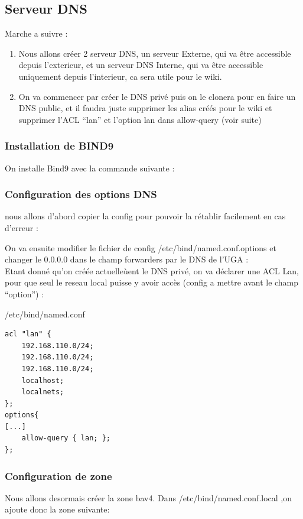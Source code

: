 \documentclass{article}
\begin{document}
\subsection{Serveur DNS}
Marche a suivre :
\begin{enumerate}
	\item Nous allons créer 2 serveur DNS, un serveur Externe, qui va être accessible depuis l’exterieur, et un serveur DNS Interne, qui va être accessible uniquement depuis l’interieur, ca sera utile pour le wiki. 
	\item On va commencer par créer le DNS privé puis on le clonera pour en faire un DNS public, et il faudra juste supprimer les alias créés pour le wiki et supprimer l’ACL “lan” et l’option lan dans allow-query (voir suite)
\end{enumerate}

\subsubsection{Installation de BIND9}
On installe Bind9 avec la commande suivante :

\subsubsection{Configuration des options DNS}
nous allons d'abord copier la config pour pouvoir la rétablir facilement en cas d'erreur :

On va ensuite modifier le fichier de config /etc/bind/named.conf.options
et changer le 0.0.0.0 dans le champ forwarders par le DNS de l'UGA : \\
Etant donné qu'on créée actuelleùent le DNS privé, on va déclarer une ACL Lan, pour que seul le reseau local puisse y avoir accès (config a mettre avant le champ “option”) :
\begin{configbox}{/etc/bind/named.conf}
\begin{lstlisting}
acl "lan" {
	192.168.110.0/24;
	192.168.110.0/24;
	192.168.110.0/24;
	localhost;
	localnets;
};
options{ 
[...] 
	allow-query { lan; }; 
};
\end{lstlisting}
\end{configbox}

\subsubsection{Configuration de zone}
Nous allons desormais créer la zone bav4. Dans /etc/bind/named.conf.local ,on ajoute donc la zone suivante:
\end{document}
